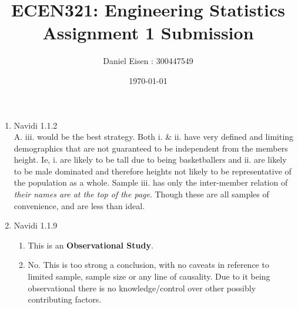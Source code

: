 \documentclass[11pt]{article}
\title{ECEN321: Engineering Statistics \\ Assignment 1 Submission}
\author{Daniel Eisen : 300447549}
\date{\today}
\begin{document}
\maketitle
\begin{enumerate}
        \section*{Sampling}
        \item Navidi 1.1.2 \\
              A. iii. would be the best strategy. Both i. \& ii. have very defined and limiting demographics that are not guaranteed to be independent from the members height. Ie, i. are likely to be tall due to being basketballers and ii. are likely to be male dominated and therefore heights not likely to be representative of the population as a whole.
              Sample iii. has only the inter-member relation of \textit{their names are at the top of the page}. Though these are all samples of convenience, and are less than ideal.

        \item Navidi 1.1.9
              \begin{enumerate}
                      \item This is an \textbf{Observational Study}.
                      \item No. This is too strong a conclusion, with no caveats in reference to limited sample, sample size or any line of causality. Due to it being observational there is no knowledge/control over other possibly contributing factors.
              \end{enumerate}


\end{enumerate}
\end{document}

